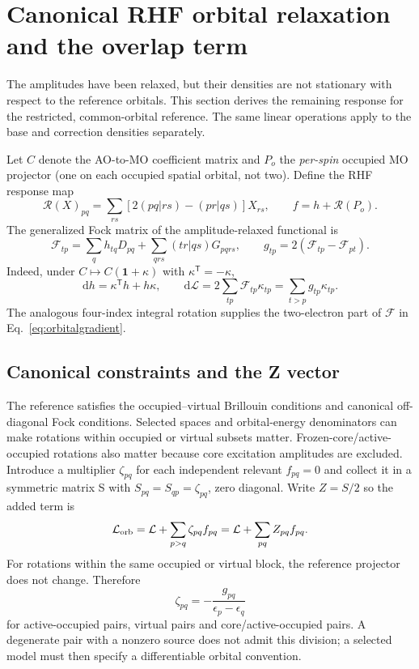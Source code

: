 \documentclass[11pt,letterpaper]{article}
\numberwithin{equation}{section}
\newcommand{\T}{\mathsf T}
\newcommand{\dd}{\mathrm d}
\begin{document}
\section{Canonical RHF orbital relaxation and the overlap term}
\label{sec:orbital}
The amplitudes have been relaxed, but their densities are not stationary
with respect to the reference orbitals. This section derives the remaining
response for the restricted, common-orbital reference. The same linear
operations apply to the base and correction densities separately.

Let $C$ denote the AO-to-MO coefficient matrix and $P_o$ the \emph{per-spin}
occupied MO projector (one on each occupied spatial orbital, not two).
Define the RHF response map
\begin{equation}
 \mathcal R(X)_{pq}=\sum_{rs}[2(pq|rs)-(pr|qs)]X_{rs},\qquad
 f=h+\mathcal R(P_o).
 \label{eq:rhfresponse}
\end{equation}
The generalized Fock matrix of the amplitude-relaxed functional is
\begin{equation}
 \mathcal F_{tp}=\sum_qh_{tq}D_{pq}
                 +\sum_{qrs}(tr|qs)G_{pqrs},\qquad
 g_{tp}=2(\mathcal F_{tp}-\mathcal F_{pt}).
 \label{eq:orbitalgradient}
\end{equation}
Indeed, under $C\mapsto C(\mathbf1+\kappa)$ with $\kappa^{\T}=-\kappa$,
\begin{equation}
 \dd h=\kappa^{\T}h+h\kappa,\qquad
 \dd\mathcal L=2\sum_{tp}\mathcal F_{tp}\kappa_{tp}
              =\sum_{t>p}g_{tp}\kappa_{tp}.
\end{equation}
The analogous four-index integral rotation supplies the two-electron part
of $\mathcal F$ in Eq.~\eqref{eq:orbitalgradient}.

\subsection{Canonical constraints and the Z vector}
The reference satisfies the occupied--virtual Brillouin conditions and
canonical off-diagonal Fock conditions. Selected spaces and orbital-energy
denominators can make rotations within occupied or virtual subsets matter.
Frozen-core/active-occupied rotations also matter because core excitation
amplitudes are excluded. Introduce a multiplier $\zeta_{pq}$ for each
independent relevant $f_{pq}=0$ and collect it in a symmetric matrix S with
$S_{pq}=S_{qp}=\zeta_{pq}$, zero diagonal. Write $Z=S/2$ so the added term is
\begin{equation}
 \mathcal L_{\rm orb}=\mathcal L+\sum_{p>q}\zeta_{pq}f_{pq}
                    =\mathcal L+\sum_{pq}Z_{pq}f_{pq}.
 \label{eq:orblagrangian}
\end{equation}
For rotations within the same occupied or virtual block, the reference
projector does not change. Therefore
\begin{equation}
 \zeta_{pq}=-\frac{g_{pq}}{\epsilon_p-\epsilon_q}
 \label{eq:zetainternal}
\end{equation}
for active-occupied pairs, virtual pairs and core/active-occupied pairs.
A degenerate pair with a nonzero source does not admit this division; a
selected model must then specify a differentiable orbital convention.
\end{document}
